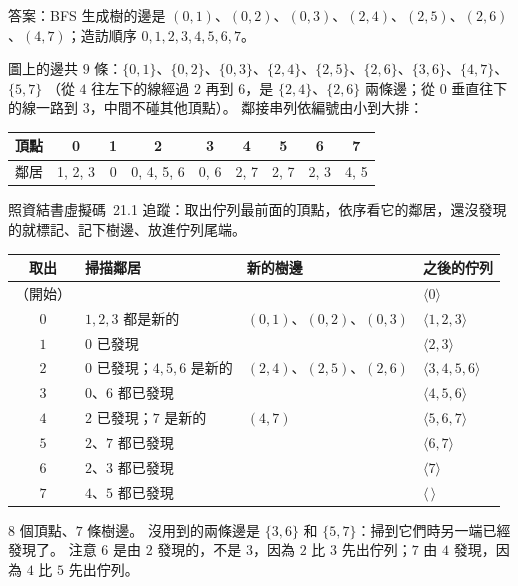 \begin{pastsoln}
答案：BFS 生成樹的邊是 $(0,1)$、$(0,2)$、$(0,3)$、$(2,4)$、$(2,5)$、$(2,6)$、$(4,7)$；造訪順序
$0, 1, 2, 3, 4, 5, 6, 7$。

圖上的邊共 $9$ 條：$\{0,1\}$、$\{0,2\}$、$\{0,3\}$、$\{2,4\}$、$\{2,5\}$、$\{2,6\}$、$\{3,6\}$、$\{4,7\}$、$\{5,7\}$
（從 $4$ 往左下的線經過 $2$ 再到 $6$，是 $\{2,4\}$、$\{2,6\}$ 兩條邊；從 $0$ 垂直往下的線一路到 $3$，中間不碰其他頂點）。
鄰接串列依編號由小到大排：
\begin{center}
\small
\begin{tabular}{c*{8}{c}}
\toprule
頂點 & 0 & 1 & 2 & 3 & 4 & 5 & 6 & 7 \\
\midrule
鄰居 & 1, 2, 3 & 0 & 0, 4, 5, 6 & 0, 6 & 2, 7 & 2, 7 & 2, 3 & 4, 5 \\
\bottomrule
\end{tabular}
\end{center}

照資結書虛擬碼~21.1 追蹤：取出佇列最前面的頂點，依序看它的鄰居，還沒發現的就標記、記下樹邊、放進佇列尾端。
\begin{center}
\small
\begin{tabular}{clll}
\toprule
取出 & 掃描鄰居 & 新的樹邊 & 之後的佇列 \\
\midrule
（開始） & & & $\langle 0 \rangle$ \\
$0$ & $1, 2, 3$ 都是新的 & $(0,1)$、$(0,2)$、$(0,3)$ & $\langle 1, 2, 3 \rangle$ \\
$1$ & $0$ 已發現 & & $\langle 2, 3 \rangle$ \\
$2$ & $0$ 已發現；$4, 5, 6$ 是新的 & $(2,4)$、$(2,5)$、$(2,6)$ & $\langle 3, 4, 5, 6 \rangle$ \\
$3$ & $0$、$6$ 都已發現 & & $\langle 4, 5, 6 \rangle$ \\
$4$ & $2$ 已發現；$7$ 是新的 & $(4,7)$ & $\langle 5, 6, 7 \rangle$ \\
$5$ & $2$、$7$ 都已發現 & & $\langle 6, 7 \rangle$ \\
$6$ & $2$、$3$ 都已發現 & & $\langle 7 \rangle$ \\
$7$ & $4$、$5$ 都已發現 & & $\langle\,\rangle$ \\
\bottomrule
\end{tabular}
\end{center}

$8$ 個頂點、$7$ 條樹邊。 沒用到的兩條邊是 $\{3,6\}$ 和 $\{5,7\}$：掃到它們時另一端已經發現了。 注意 $6$ 是由 $2$
發現的，不是 $3$，因為 $2$ 比 $3$ 先出佇列；$7$ 由 $4$ 發現，因為 $4$ 比 $5$ 先出佇列。


\end{pastsoln}
